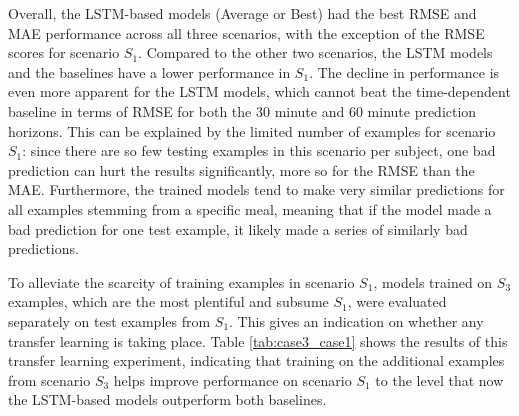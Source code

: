\documentclass{ecai}
\begin{document}
Overall, the LSTM-based models (Average or Best) had the best RMSE and MAE performance across all three scenarios, with the exception of the RMSE scores for scenario $S_1$. Compared to the other two scenarios, the LSTM models and the baselines have a lower performance in $S_1$. The decline in performance is even more apparent for the LSTM models, which cannot beat the time-dependent baseline in terms of RMSE for both the 30 minute and 60 minute prediction horizons. This can be explained by the limited number of examples for scenario $S_1$: since there are so few testing examples in this scenario per subject, one bad prediction can hurt the results significantly, more so for the RMSE than the MAE. Furthermore, the trained models tend to make very similar predictions for all examples stemming from a specific meal, meaning that if the model made a bad prediction for one test example, it likely made a series of similarly bad predictions.

To alleviate the scarcity of training examples in scenario $S_1$, models trained on $S_3$ examples, which are the most plentiful and subsume $S_1$, were evaluated separately on test examples from $S_1$. This gives an indication on whether any transfer learning is taking place. Table \ref{tab:case3_case1} shows the results of this transfer learning experiment, indicating that training on the additional examples from scenario $S_3$ helps improve performance on scenario $S_1$ to the level that now the LSTM-based models outperform both baselines.%

\end{document}
